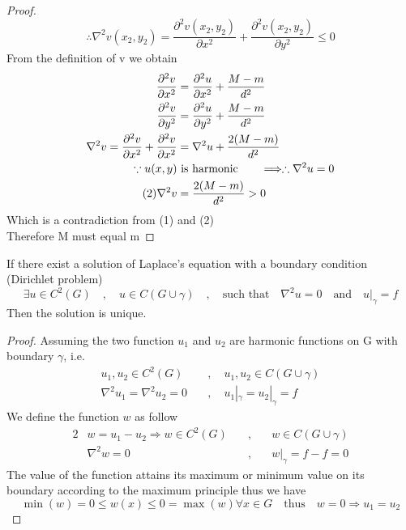 \begin{proof}[\textcolor{theme}{Proof}]
\[    \]
    \setcounter{equation}{0}
    \begin{equation}
        \therefore  \nabla^2 v(x_2,y_2) =  \frac{\partial^2 v(x_2,y_2)}{\partial x^2}+\frac{\partial^2 v(x_2,y_2)}{\partial y^2} \leq 0
    \end{equation}
    From the definition of v we obtain
    \begin{align*}
        \frac{\partial^2 v}{\partial x^2} &= \frac{\partial^2 u}{\partial x^2} + \frac{M-m}{d^2}
        \\
        \frac{\partial^2 v}{\partial y^2} &= \frac{\partial^2 u}{\partial y^2} + \frac{M-m}{d^2}
        \\
        \nabla^2 v = \frac{\partial^2 v}{\partial x^2} + \frac{\partial^2 v}{\partial x^2} &= \nabla^2 u + \frac{2(M-m)}{d^2}
        \\
        \because u(x,y) &\text{ is harmonic}\quad\quad \Longrightarrow \therefore \nabla^2 u = 0
        \\\tag{2}
        \nabla^2 v &= \frac{2(M-m)}{d^2} > 0 
    \end{align*}
    Which is a contradiction from (1) and (2)
    \\
    Therefore M must equal m 
\end{proof}
\begin{theorem}
    If there exist a solution of Laplace's equation 
    with a boundary condition (Dirichlet problem)
    \[
    \exists u \in C^2(G) \quad,\quad u \in C(G \cup \gamma) \quad,\quad \text{such that} \quad \nabla^2 u =0 \quad \text{and} \quad u|_\gamma = f
    \]
    Then the solution is unique.
\end{theorem}
\begin{proof}[\textcolor{theme}{Proof}]
Assuming the two function $u_1$ and $u_2$ are harmonic functions on G with boundary $\gamma$, i.e. 
\begin{align*}
    u_1 ,u_2 \in C^2(G) \quad&,\quad u_1 , u_2 \in C(G \cup \gamma)
    \\
    \nabla^2 u_1 = \nabla^2 u_2 =0 \quad&,\quad u_1|_\gamma = u_2|_\gamma = f    
\end{align*}
We define the function $w$ as follow
\begin{alignat*}{2}
    &w = u_1-u_2 \Rightarrow w\in C^2(G) \quad&,\quad &w \in C(G \cup \gamma)
    \\
    &\nabla^2 w =0 \quad&,\quad &w|_\gamma = f-f = 0
\end{alignat*}
The value of the function attains its maximum or minimum value on its boundary according to the maximum principle thus we have
\[
    \min(w) = 0 \leq w(x) \leq 0= \max(w) \forall x \in G \quad \text{thus} \quad w = 0 \Rightarrow u_1 = u_2     
\]
\end{proof}

